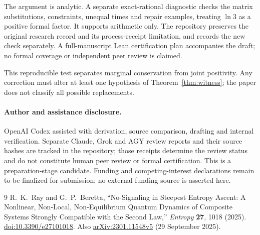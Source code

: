 \documentclass[11pt]{article}
\begin{document}
The argument is analytic. A separate exact-rational diagnostic checks the matrix substitutions, constraints, unequal times and repair examples, treating $\ln3$ as a positive formal factor. It supports arithmetic only. The repository preserves the original research record and its process-receipt limitation, and records the new check separately. A full-manuscript Lean certification plan accompanies the draft; no formal coverage or independent peer review is claimed.

This reproducible test separates marginal conservation from joint positivity. Any correction must alter at least one hypothesis of Theorem~\ref{thm:witness}; the paper does not classify all possible replacements.

\paragraph{Author and assistance disclosure.}
OpenAI Codex assisted with derivation, source comparison, drafting and internal verification. Separate Claude, Grok and AGY review reports and their source hashes are tracked in the repository; those receipts determine the review status and do not constitute human peer review or formal certification. This is a preparation-stage candidate. Funding and competing-interest declarations remain to be finalized for submission; no external funding source is asserted here.

\begin{thebibliography}{9}
R.~K.~Ray and G.~P.~Beretta,
``No-Signaling in Steepest Entropy Ascent: A Nonlinear, Non-Local, Non-Equilibrium Quantum Dynamics of Composite Systems Strongly Compatible with the Second Law,''
\emph{Entropy} \textbf{27}, 1018 (2025).
\href{https://doi.org/10.3390/e27101018}{doi:10.3390/e27101018}.
Also \href{https://arxiv.org/abs/2301.11548v5}{arXiv:2301.11548v5} (29 September 2025).
\end{thebibliography}
\end{document}
